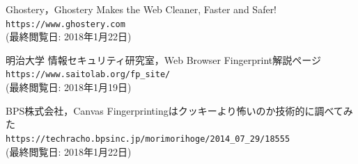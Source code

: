 \documentclass[10pt, a4paper]{jreport}
\begin{document}
\begin{thebibliography}{n}
 Ghostery，Ghostery Makes the Web Cleaner, Faster and Safer!\\
\verb|https://www.ghostery.com|\\
(最終閲覧日: 2018年1月22日)

 明治大学 情報セキュリティ研究室，Web Browser Fingerprint解説ページ\\
\verb|https://www.saitolab.org/fp_site/|\\
(最終閲覧日: 2018年1月19日)

 BPS株式会社，Canvas Fingerprintingはクッキーより怖いのか技術的に調べてみた\\
\verb|https://techracho.bpsinc.jp/morimorihoge/2014_07_29/18555|\\
(最終閲覧日: 2018年1月22日)

\end{thebibliography}

\end{document}
